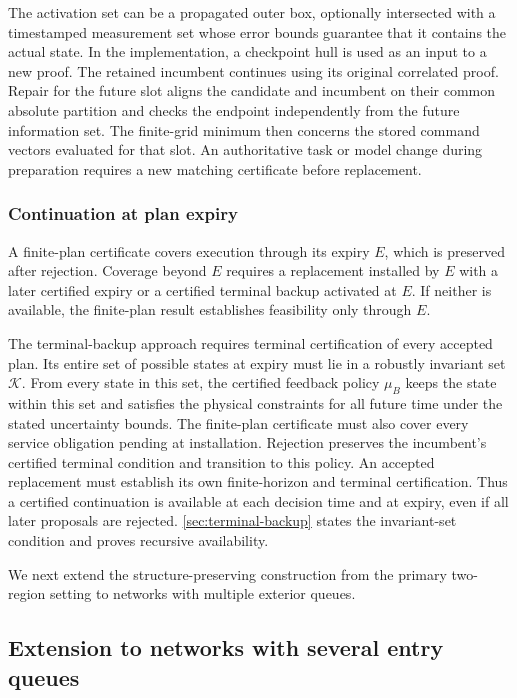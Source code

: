 \documentclass[preprint,12pt]{elsarticle}
\newcommand{\appref}[1]{\ref{#1}}
\begin{document}
The activation set can be a propagated outer box, optionally intersected
with a timestamped measurement set whose error bounds guarantee that it
contains the actual state. In the implementation, a checkpoint hull
is used as an input to a new proof. The retained incumbent continues
using its original correlated proof. Repair for the future slot aligns
the candidate and incumbent on their common absolute partition and
checks the endpoint independently from the future information set.
The finite-grid minimum then concerns the stored command vectors
evaluated for that slot. An authoritative task or model change during
preparation requires a new matching certificate before replacement.

\subsubsection{Continuation at plan expiry}
\label{sec:terminal-backup-main}

A finite-plan certificate covers execution through its expiry $E$, which
is preserved after rejection. Coverage beyond $E$ requires a replacement
installed by $E$ with a later certified expiry or a certified terminal
backup activated at $E$. If neither is available, the finite-plan result
establishes feasibility only through $E$.

The terminal-backup approach requires terminal certification of every
accepted plan. Its entire set of possible states at
expiry must lie in a robustly invariant set $\mathcal K$. From every state
in this set, the certified feedback policy $\mu_B$ keeps the state within this set and satisfies the physical
constraints for all future time under the stated uncertainty bounds. The finite-plan certificate must
also cover every service obligation pending at installation.
Rejection preserves the incumbent's certified terminal condition and
transition to this policy. An accepted replacement must establish its own
finite-horizon and terminal certification. Thus a certified continuation
is available at each decision time and at expiry, even if all later
proposals are rejected. \appref{sec:terminal-backup} states the invariant-set
condition and proves recursive availability.

We next extend the structure-preserving construction from the primary
two-region setting to networks with multiple exterior queues.




\subsection{Extension to networks with several entry queues}
\label{sec:network-extension}
\end{document}
